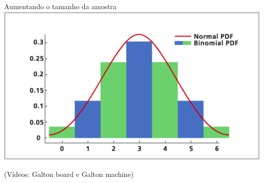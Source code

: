\documentclass{beamer}
\begin{document}
\begin{frame}{Aumentando o tamanho da amostra}
  \includegraphics[width=\textwidth]{Prob_II/aproximacao}

  (Vídeos: Galton board e Galton machine)
\end{frame}
\end{document}
